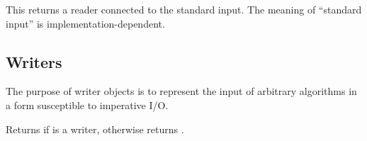 \begin{entry}{%
}
   
This returns a reader connected to the standard input. The meaning of
``standard input'' is implementation-dependent.
\end{entry}

\subsection{Writers}

The purpose of writer objects is to represent the input of arbitrary
algorithms in a form susceptible to imperative I/O.

\begin{entry}{%
}
   
Returns \schtrue{} if  is a writer, otherwise returns \schfalse.
\end{entry}

